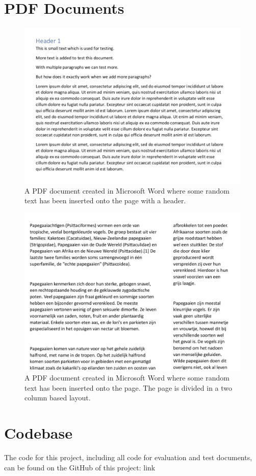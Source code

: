 \appendix
\chapter{PDF Documents}
\begin{figure}[h]
    \hspace{-18mm}
    \includegraphics[scale=0.6]{latex/media/exm.png}
    \caption{A PDF document created in Microsoft Word where some random text has been inserted onto the page with a header.}
    \label{fig:example-pdf-lorem-ipsum}
\end{figure}

\begin{figure}[h]
    \hspace{-18mm}
    \includegraphics[scale=0.4]{latex/media/multicol.png}
    \caption{A PDF document created in Microsoft Word where some random text has been inserted onto the page. The page is divided in a two column based layout.}
    \label{fig:example-column-page}
\end{figure}

\chapter{Codebase}
The code for this project, including all code for evaluation and test documents, can be found on the GitHub of this project: link 